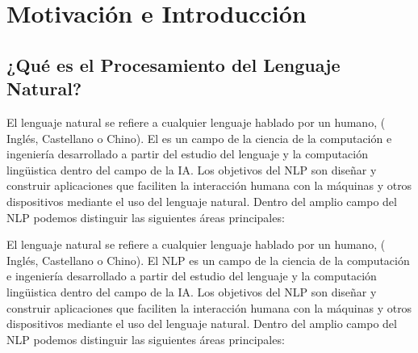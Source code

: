 \chapter{Motivación e Introducción}\label{ch:introduction}








\section{¿Qué es el Procesamiento del Lenguaje Natural?}
\label{sec:whatisnlp}

El lenguaje natural se refiere a cualquier lenguaje hablado por un humano, (\eg
Inglés, Castellano o Chino). El  es un
campo de la ciencia de la computación e ingeniería desarrollado a partir del
estudio del lenguaje y la computación lingüistica dentro del campo de la
\ac{IA}. Los objetivos del \ac{NLP} son diseñar y construir aplicaciones que
faciliten la interacción humana con la máquinas y otros dispositivos mediante el
uso del lenguaje natural. Dentro del amplio campo del \ac{NLP} podemos
distinguir las siguientes áreas principales:

El lenguaje natural se refiere a cualquier lenguaje hablado por un humano, (\eg
Inglés, Castellano o Chino). El \ac{NLP} es un campo de la
ciencia de la computación e ingeniería desarrollado a partir del estudio del
lenguaje y la computación lingüistica dentro del campo de la \ac{IA}. Los
objetivos del \ac{NLP} son diseñar y construir aplicaciones que faciliten la
interacción humana con la máquinas y otros dispositivos mediante el uso del
lenguaje natural. Dentro del amplio campo del \ac{NLP} podemos distinguir las
siguientes áreas principales:

